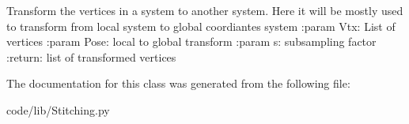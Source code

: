 \begin{DoxyVerb}Transform the vertices in a system to another system.
Here it will be mostly used to transform from local system to global coordiantes system
:param Vtx: List of vertices
:param Pose:  local to global transform
:param s: subsampling factor
:return: list of transformed vertices
\end{DoxyVerb}
 

The documentation for this class was generated from the following file\+:\begin{DoxyCompactItemize}
\item 
code/lib/Stitching.\+py\end{DoxyCompactItemize}
